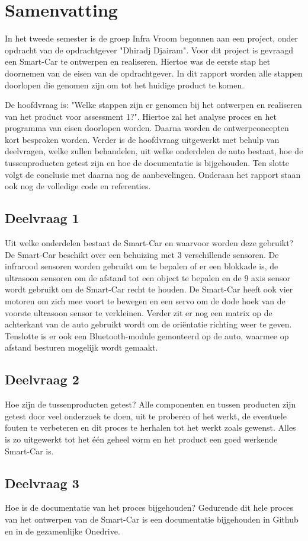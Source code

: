 \section{Samenvatting}
In het tweede semester is de groep Infra Vroom begonnen aan een project, onder opdracht van de opdrachtgever "Dhiradj Djairam". Voor dit project is gevraagd een \gls{Smart-Car} te ontwerpen en realiseren. Hiertoe was de eerste stap het doornemen van de eisen van de opdrachtgever. In dit rapport worden alle stappen doorlopen die genomen zijn om tot het huidige product te komen.  

De hoofdvraag is: "Welke stappen zijn er genomen bij het ontwerpen en realiseren van het product voor assessment 1?". Hiertoe zal het analyse proces en het programma van eisen doorlopen worden. Daarna worden de ontwerpconcepten kort besproken worden. Verder is de hoofdvraag uitgewerkt met behulp van deelvragen, welke zullen behandelen, uit welke onderdelen de auto bestaat, hoe de tussenproducten getest zijn en hoe de documentatie is bijgehouden. Ten slotte volgt de conclusie met daarna nog de aanbevelingen. Onderaan het rapport staan ook nog de volledige code en referenties.  

\subsection{Deelvraag 1}
Uit welke onderdelen bestaat de \gls{Smart-Car} en waarvoor worden deze gebruikt?
De \gls{Smart-Car} beschikt over een behuizing met 3 verschillende sensoren. De infrarood sensoren worden gebruikt om te bepalen of er een blokkade is, de ultrasoon sensoren om de afstand tot een object te bepalen en de 9 axis sensor wordt gebruikt om de \gls{Smart-Car} recht te houden. De \gls{Smart-Car} heeft ook vier motoren om zich mee voort te bewegen en een servo om de dode hoek van de voorste ultrasoon sensor te verkleinen. Verder zit er nog een matrix op de achterkant van de auto gebruikt wordt om de oriëntatie richting weer te geven. Tenslotte is er ook een \gls{Bluetooth}-module gemonteerd op de auto, waarmee op afstand besturen mogelijk wordt gemaakt. 

\subsection{Deelvraag 2}
Hoe zijn de tussenproducten getest?
Alle componenten en tussen producten zijn getest door veel onderzoek te doen, uit te proberen of het werkt, de eventuele fouten te verbeteren en dit proces te herhalen tot het werkt zoals gewenst. Alles is zo uitgewerkt tot het één geheel vorm en het product een goed werkende \gls{Smart-Car} is. 

\subsection{Deelvraag 3}
Hoe is de documentatie van het proces bijgehouden?
 Gedurende dit hele proces van het ontwerpen van de \gls{Smart-Car} is een documentatie bijgehouden in Github en in de gezamenlijke Onedrive. 